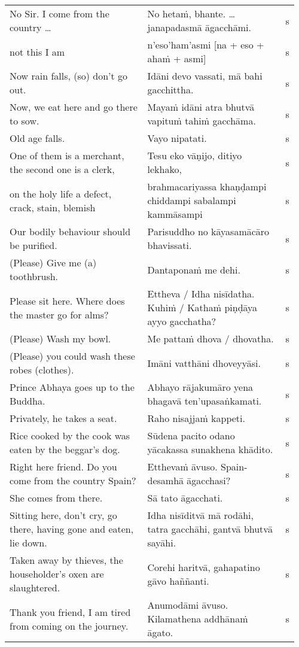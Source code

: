 \documentclass[a5paper]{memoir}
\begin{document}
\begin{longtable}{L{0.48\linewidth} L{0.48\linewidth} H}
No Sir. I come from the country \ldots{} & No hetaṁ, bhante. \ldots{} janapadasmā āgacchāmi. & s\\[0pt]
not this I am & n'eso'ham'asmi [na + eso + ahaṁ + asmi] & s\\[0pt]
Now rain falls, (so) don't go out. & Idāni devo vassati, mā bahi gacchittha. & s\\[0pt]
Now, we eat here and go there to sow. & Mayaṁ idāni atra bhutvā vapituṁ tahiṁ gacchāma. & s\\[0pt]
Old age falls. & Vayo nipatati. & s\\[0pt]
One of them is a merchant, the second one is a clerk, & Tesu eko vāṇijo, ditiyo lekhako, & s\\[0pt]
on the holy life a defect, crack, stain, blemish & brahmacariyassa khaṇḍampi chiddampi sabalampi kammāsampi & s\\[0pt]
Our bodily behaviour should be purified. & Parisuddho no kāyasamācāro bhavissati. & s\\[0pt]
(Please) Give me (a) toothbrush. & Dantaponaṁ me dehi. & s\\[0pt]
Please sit here. Where does the master go for alms? & Ettheva / Idha nisīdatha. Kuhiṁ / Kathaṁ piṇḍāya ayyo gacchatha? & s\\[0pt]
(Please) Wash my bowl. & Me pattaṁ dhova / dhovatha. & s\\[0pt]
(Please) you could wash these robes (clothes). & Imāni vatthāni dhoveyyāsi. & s\\[0pt]
Prince Abhaya goes up to the Buddha. & Abhayo rājakumāro yena bhagavā ten'upasaṅkamati. & s\\[0pt]
Privately, he takes a seat. & Raho nisajjaṁ kappeti. & s\\[0pt]
Rice cooked by the cook was eaten by the beggar's dog. & Sūdena pacito odano yācakassa sunakhena khādito. & s\\[0pt]
Right here friend. Do you come from the country Spain? & Etthevaṁ āvuso. Spain-desamhā āgacchasi? & s\\[0pt]
She comes from there. & Sā tato āgacchati. & s\\[0pt]
Sitting here, don't cry, go there, having gone and eaten, lie down. & Idha nisīditvā mā rodāhi, tatra gacchāhi, gantvā bhutvā sayāhi. & s\\[0pt]
Taken away by thieves, the householder's oxen are slaughtered. & Corehi haritvā, gahapatino gāvo haññanti. & s\\[0pt]
Thank you friend, I am tired from coming on the journey. & Anumodāmi āvuso. Kilamathena addhānaṁ āgato. & s\\[0pt]

\end{longtable}
\end{document}
